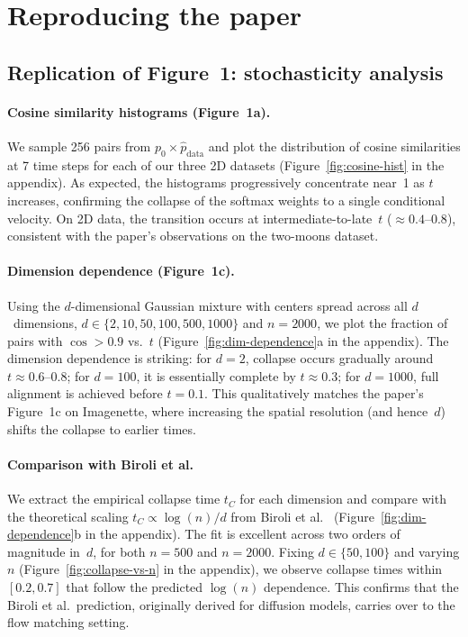 \documentclass[10pt,a4paper]{article}
\theoremstyle{definition}
\begin{document}
\section{Reproducing the paper}\label{sec:reproduce}

\subsection{Replication of Figure~1: stochasticity analysis}\label{subsec:fig1}

\paragraph{Cosine similarity histograms (Figure~1a).}
We sample 256 pairs from $p_0 \times \hat{p}_{\mathrm{data}}$ and plot the distribution of cosine similarities at 7 time steps for each of our three 2D datasets (Figure~\ref{fig:cosine-hist} in the appendix).
As expected, the histograms progressively concentrate near~1 as $t$ increases, confirming the collapse of the softmax weights to a single conditional velocity.
On 2D data, the transition occurs at intermediate-to-late~$t$ ($\approx 0.4$--$0.8$), consistent with the paper's observations on the two-moons dataset.

\paragraph{Dimension dependence (Figure~1c).}
Using the $d$-dimensional Gaussian mixture with centers spread across all $d$~dimensions, $d \in \{2, 10, 50, 100, 500, 1000\}$ and $n = 2000$, we plot the fraction of pairs with $\cos > 0.9$ vs.~$t$ (Figure~\ref{fig:dim-dependence}a in the appendix).
The dimension dependence is striking: for $d = 2$, collapse occurs gradually around $t \approx 0.6$--$0.8$; for $d = 100$, it is essentially complete by $t \approx 0.3$; for $d = 1000$, full alignment is achieved before $t = 0.1$.
This qualitatively matches the paper's Figure~1c on Imagenette, where increasing the spatial resolution (and hence~$d$) shifts the collapse to earlier times.

\paragraph{Comparison with Biroli et al.}
We extract the empirical collapse time $t_C$ for each dimension and compare with the theoretical scaling $t_C \propto \log(n)/d$ from Biroli et al.~\cite{biroli2024dynamical} (Figure~\ref{fig:dim-dependence}b in the appendix).
The fit is excellent across two orders of magnitude in~$d$, for both $n = 500$ and $n = 2000$.
Fixing $d \in \{50, 100\}$ and varying $n$ (Figure~\ref{fig:collapse-vs-n} in the appendix), we observe collapse times within $[0.2, 0.7]$ that follow the predicted $\log(n)$ dependence.
This confirms that the Biroli et al.\ prediction, originally derived for diffusion models, carries over to the flow matching setting.
\end{document}
